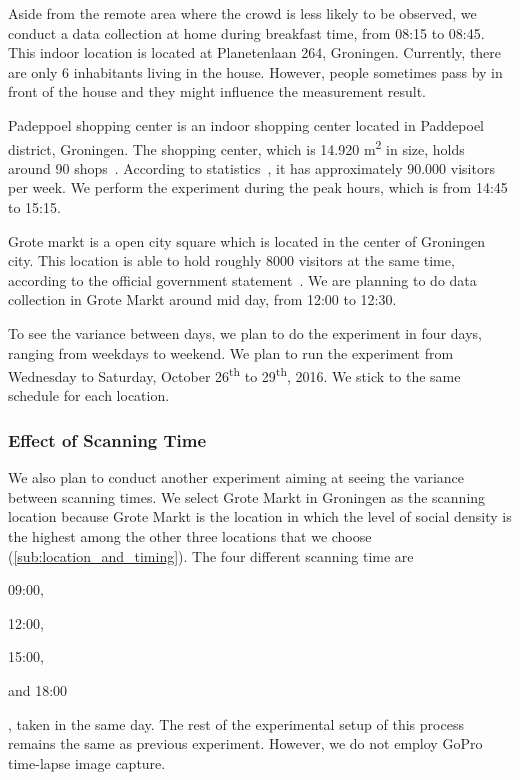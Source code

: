 Aside from the remote area where the crowd is less likely to be observed, we conduct a data collection at home during breakfast time, from 08:15 to 08:45. This indoor location is located at Planetenlaan 264, Groningen. Currently, there are only 6 inhabitants living in the house. However, people sometimes pass by in front of the house and they might influence the measurement result.

Padeppoel shopping center is an indoor shopping center located in Paddepoel district, Groningen. The shopping center, which is 14.920 m\textsuperscript{2} in size, holds around 90 shops~\cite{paddepoelstat}. According to statistics~\cite{paddepoelstat}, it has approximately 90.000 visitors per week. We perform the experiment during the peak hours, which is from 14:45 to 15:15.

Grote markt is a open city square which is located in the center of Groningen city. This location is able to hold roughly 8000 visitors at the same time, according to the official government statement~\cite{GemeenteGroningen2016}. We are planning to do data collection in Grote Markt around mid day, from 12:00 to 12:30.

To see the variance between days, we plan to do the experiment in four days, ranging from weekdays to weekend. We plan to run the experiment from Wednesday to Saturday, October 26\textsuperscript{th} to 29\textsuperscript{th}, 2016. We stick to the same schedule for each location.

\subsubsection{Effect of Scanning Time} %
\label{ssub:effect_of_scanning_time}
We also plan to conduct another experiment aiming at seeing the variance between scanning times. We select Grote Markt in Groningen as the scanning location because Grote Markt is the location in which the level of social density is the highest among the other three locations that we choose (\autoref{sub:location_and_timing}). The four different scanning time are
\begin{enumerate*}[label={\alph*)},font={\color{red!50!black}\bfseries}]
  \item 09:00,
  \item 12:00,
  \item 15:00,
  \item and 18:00
\end{enumerate*},
taken in the same day. The rest of the experimental setup of this process remains the same as previous experiment. However, we do not employ GoPro time-lapse image capture.

